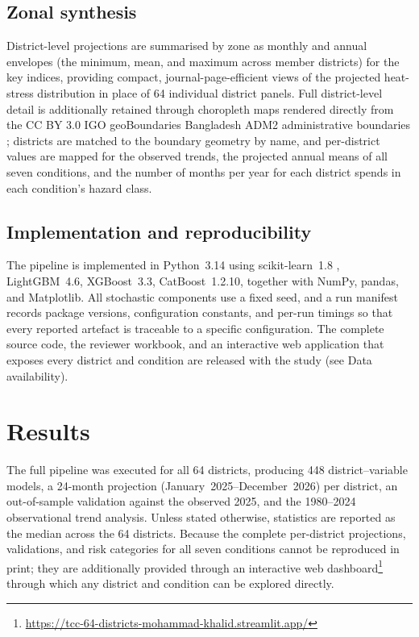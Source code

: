 \documentclass[review,11pt]{elsarticle}
\begin{document}
\subsection{Zonal synthesis}\label{sec:zonal}
District-level projections are summarised by zone as monthly and annual
envelopes (the minimum, mean, and maximum across member districts) for the key
indices, providing compact, journal-page-efficient views of the projected
heat-stress distribution in place of 64 individual district panels. Full
district-level detail is additionally retained through choropleth maps rendered
directly from the CC BY 3.0 IGO geoBoundaries Bangladesh ADM2 administrative
boundaries \citep{GeoBoundaries2020}; districts are matched to the boundary geometry
by name, and per-district values are mapped for the observed trends, the projected
annual means of all seven conditions, and the number of months per year for each
district spends in each condition's hazard class.

\subsection{Implementation and reproducibility}\label{sec:impl}
The pipeline is implemented in Python~3.14 using scikit-learn~1.8
\citep{Pedregosa2011}, LightGBM~4.6, XGBoost~3.3, CatBoost~1.2.10, together with
NumPy, pandas, and Matplotlib. All stochastic components use a fixed seed, and a
run manifest records package versions, configuration constants, and per-run
timings so that every reported artefact is traceable to a specific
configuration. The complete source code, the reviewer workbook, and an
interactive web application that exposes every district and condition are
released with the study (see Data availability).

\section{Results}\label{sec:results}

The full pipeline was executed for all 64 districts, producing 448
district--variable models, a 24-month projection (January~2025--December~2026)
per district, an out-of-sample validation against the observed 2025, and the
1980--2024 observational trend analysis. Unless stated otherwise, statistics are
reported as the median across the 64 districts. Because the complete per-district
projections, validations, and risk categories for all seven conditions cannot be
reproduced in print; they are additionally provided through an interactive web
dashboard\footnote{\url{https://tcc-64-districts-mohammad-khalid.streamlit.app/}}
through which any district and condition can be explored directly.
\end{document}
